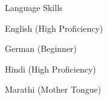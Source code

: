 \begin{cvskills}
  \cvskill
    {Language Skills} %
    {\begin{cvitems_3} %
        \item {English (High Proficiency)}
        \item {German (Beginner)}
        \item {Hindi (High Proficiency)}
        \item {Marathi (Mother Tongue)}
      \end{cvitems_3}} %

\end{cvskills}
